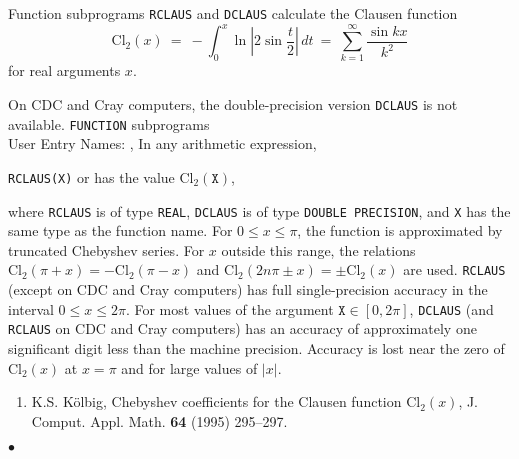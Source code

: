                          
                   
\Submitter{}                             
Function subprograms {\tt RCLAUS} and {\tt DCLAUS} calculate the
Clausen function
$$ \mathrm{Cl}_2(x) \ = \ \displaystyle
- \int_0^x \ln \left|2 \sin \frac{t}{2}\right|\,dt \ = \
\sum_{k=1}^\infty \frac{\sin kx}{k^2} $$
for real arguments $x$.
\par
On CDC and Cray computers, the double-precision version
{\tt DCLAUS} is not available.
\Structure
{\tt FUNCTION} subprograms\\
User Entry Names: , 
\Usage
In any arithmetic expression,
\begin{center}
{\tt RCLAUS(X)} \quad or  \quad has the value \quad
$\mathrm{Cl}_2(\mathtt{X})$,
\end{center}
where {\tt RCLAUS} is of type {\tt REAL}, {\tt DCLAUS} is of type
{\tt DOUBLE PRECISION}, and {\tt X} has the same type as the function
name.
\Method
For $0 \le x \le \pi$, the function is approximated by truncated
Chebyshev series. For $x$ outside this range, the relations
$\mathrm{Cl}_2(\pi+x)=-\mathrm{Cl}_2(\pi-x)$ and
$\mathrm{Cl}_2(2n\pi \pm x)=\pm \mathrm{Cl}_2(x)$ are used.
\Accuracy
{\tt RCLAUS} (except on CDC and Cray computers)
has full single-precision accuracy in the interval $0 \le x \le 2\pi$.
For most values of the argument $\mathtt{X} \in [0,2\pi]$, {\tt DCLAUS}
(and {\tt RCLAUS} on CDC and Cray computers) has an accuracy of
approximately one significant digit less than the machine precision.
Accuracy is lost near the zero of $\mathrm{Cl}_2(x)$ at $x=\pi$
and for large values of $|x|$.
\Refer
\begin{enumerate}
\item K.S. K\"olbig, Chebyshev coefficients for the Clausen function
$\mathrm{Cl}_2(x)$, J. Comput. Appl. Math. {\bf 64} (1995) 295--297.
\end{enumerate}
$\bullet$
